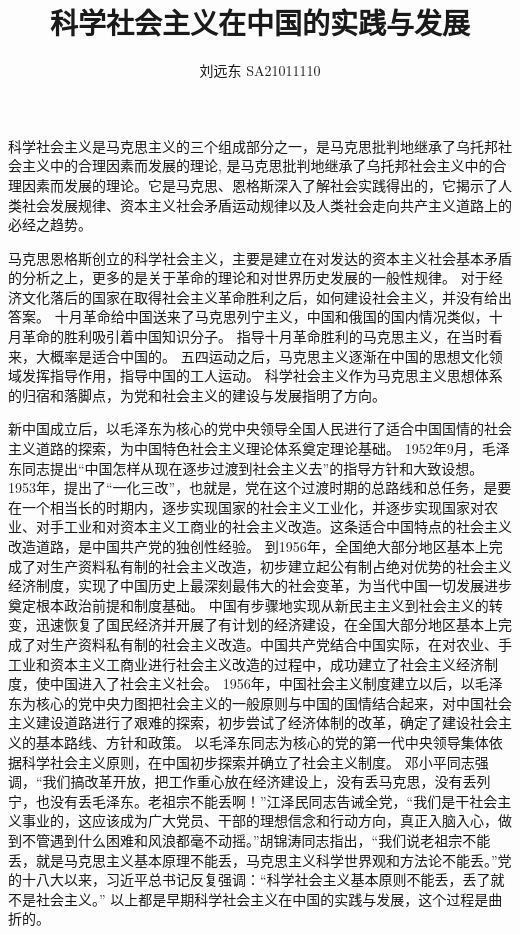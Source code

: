 \documentclass{article}
\title{科学社会主义在中国的实践与发展}
\author{刘远东 SA21011110}
\begin{document}
科学社会主义是马克思主义的三个组成部分之一，是马克思批判地继承了乌托邦社会主义中的合理因素而发展的理论,
是马克思批判地继承了乌托邦社会主义中的合理因素而发展的理论。它是马克思、恩格斯深入了解社会实践得出的，它揭示了人类社会发展规律、资本主义社会矛盾运动规律以及人类社会走向共产主义道路上的必经之趋势。

马克思恩格斯创立的科学社会主义，主要是建立在对发达的资本主义社会基本矛盾的分析之上，更多的是关于革命的理论和对世界历史发展的一般性规律。
对于经济文化落后的国家在取得社会主义革命胜利之后，如何建设社会主义，并没有给出答案。
十月革命给中国送来了马克思列宁主义，中国和俄国的国内情况类似，十月革命的胜利吸引着中国知识分子。
指导十月革命胜利的马克思主义，在当时看来，大概率是适合中国的。
五四运动之后，马克思主义逐渐在中国的思想文化领域发挥指导作用，指导中国的工人运动。
科学社会主义作为马克思主义思想体系的归宿和落脚点，为党和社会主义的建设与发展指明了方向。

新中国成立后，以毛泽东为核心的党中央领导全国人民进行了适合中国国情的社会主义道路的探索，为中国特色社会主义理论体系奠定理论基础。
1952年9月，毛泽东同志提出“中国怎样从现在逐步过渡到社会主义去”的指导方针和大致设想。
1953年，提出了“一化三改”，也就是，党在这个过渡时期的总路线和总任务，是要在一个相当长的时期内，逐步实现国家的社会主义工业化，并逐步实现国家对农业、对手工业和对资本主义工商业的社会主义改造。这条适合中国特点的社会主义改造道路，是中国共产党的独创性经验。
到1956年，全国绝大部分地区基本上完成了对生产资料私有制的社会主义改造，初步建立起公有制占绝对优势的社会主义经济制度，实现了中国历史上最深刻最伟大的社会变革，为当代中国一切发展进步奠定根本政治前提和制度基础。
中国有步骤地实现从新民主主义到社会主义的转变，迅速恢复了国民经济并开展了有计划的经济建设，在全国大部分地区基本上完成了对生产资料私有制的社会主义改造。中国共产党结合中国实际，在对农业、手工业和资本主义工商业进行社会主义改造的过程中，成功建立了社会主义经济制度，使中国进入了社会主义社会。
1956年，中国社会主义制度建立以后，以毛泽东为核心的党中央力图把社会主义的一般原则与中国的国情结合起来，对中国社会主义建设道路进行了艰难的探索，初步尝试了经济体制的改革，确定了建设社会主义的基本路线、方针和政策。
以毛泽东同志为核心的党的第一代中央领导集体依据科学社会主义原则，在中国初步探索并确立了社会主义制度。
邓小平同志强调，“我们搞改革开放，把工作重心放在经济建设上，没有丢马克思，没有丢列宁，也没有丢毛泽东。老祖宗不能丢啊！”江泽民同志告诫全党，“我们是干社会主义事业的，这应该成为广大党员、干部的理想信念和行动方向，真正入脑入心，做到不管遇到什么困难和风浪都毫不动摇。”胡锦涛同志指出，“我们说老祖宗不能丢，就是马克思主义基本原理不能丢，马克思主义科学世界观和方法论不能丢。”党的十八大以来，习近平总书记反复强调：“科学社会主义基本原则不能丢，丢了就不是社会主义。”
以上都是早期科学社会主义在中国的实践与发展，这个过程是曲折的。
\end{document}
